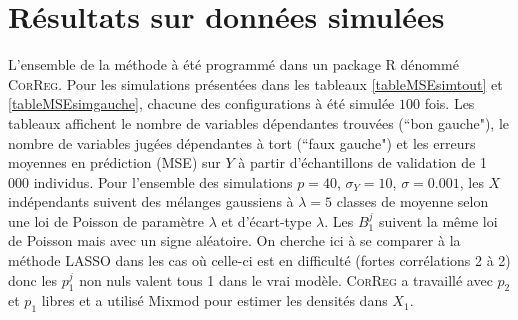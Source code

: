 \documentclass[12pt]{article}
\begin{document}
\section{Résultats sur données simulées}\label{secressim}	
L'ensemble de la méthode à été programmé dans un package R dénommé \textsc{CorReg}. Pour les simulations présentées dans les tableaux %
 \ref{tableMSEsimtout} et \ref{tableMSEsimgauche}, chacune des configurations à été simulée $100$ fois. Les tableaux affichent le nombre de variables dépendantes trouvées (``bon gauche"), le nombre de variables jugées dépendantes à tort (``faux gauche") et les erreurs moyennes en prédiction (MSE) sur $Y$ à partir d'échantillons de validation de 1 000 individus. Pour l'ensemble des simulations $p=40$, $\sigma_Y=10$, $\sigma=0.001$, les $X$ indépendants suivent des mélanges gaussiens à $\lambda=5$ classes de moyenne selon une loi de Poisson de paramètre $\lambda$ et d'écart-type $\lambda$. Les $B_{1}^j$ suivent la même loi de Poisson mais avec un signe aléatoire. On cherche ici à se comparer à la méthode LASSO dans les cas où celle-ci est en difficulté (fortes corrélations 2 à 2) donc les $p_1^j$ non nuls valent tous 1 dans le vrai modèle. \textsc{CorReg}  a  travaillé avec $p_2$ et $p_1$ libres et a utilisé Mixmod pour estimer les densités dans $X_1$. 
%
\end{document}
